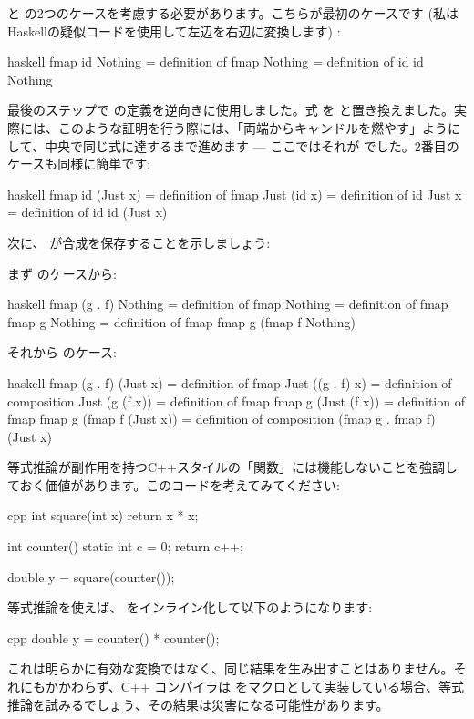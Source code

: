  と  の2つのケースを考慮する必要があります。こちらが最初のケースです (私はHaskellの疑似コードを使用して左辺を右辺に変換します) : 

\begin{snip}{haskell}
  fmap id Nothing
= { definition of fmap }
  Nothing
= { definition of id }
  id Nothing
\end{snip}
最後のステップで  の定義を逆向きに使用しました。式  を  と置き換えました。実際には、このような証明を行う際には、「両端からキャンドルを燃やす」ようにして、中央で同じ式に達するまで進めます — ここではそれが  でした。2番目のケースも同様に簡単です: 

\begin{snip}{haskell}
  fmap id (Just x)
= { definition of fmap }
  Just (id x)
= { definition of id }
  Just x
= { definition of id }
  id (Just x)
\end{snip}
次に、 が合成を保存することを示しましょう: 

まず  のケースから: 

\begin{snip}{haskell}
  fmap (g . f) Nothing
= { definition of fmap }
  Nothing
= { definition of fmap }
  fmap g Nothing
= { definition of fmap }
  fmap g (fmap f Nothing)
\end{snip}
それから  のケース: 

\begin{snip}{haskell}
  fmap (g . f) (Just x)
= { definition of fmap }
  Just ((g . f) x)
= { definition of composition }
  Just (g (f x))
= { definition of fmap }
  fmap g (Just (f x))
= { definition of fmap }
  fmap g (fmap f (Just x))
= { definition of composition }
  (fmap g . fmap f) (Just x)
\end{snip}
等式推論が副作用を持つC++スタイルの「関数」には機能しないことを強調しておく価値があります。このコードを考えてみてください: 

\begin{snip}{cpp}
int square(int x) {
    return x * x;
}

int counter() {
    static int c = 0;
    return c++;
}

double y = square(counter());
\end{snip}
等式推論を使えば、 をインライン化して以下のようになります: 

\begin{snip}{cpp}
double y = counter() * counter();
\end{snip}
これは明らかに有効な変換ではなく、同じ結果を生み出すことはありません。それにもかかわらず、C++ コンパイラは  をマクロとして実装している場合、等式推論を試みるでしょう、その結果は災害になる可能性があります。

